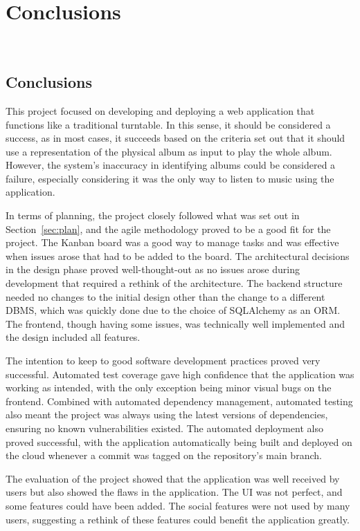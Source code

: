 \chapter{Conclusions}~\label{cha:conclusion}

\section{Conclusions}
This project focused on developing and deploying a web application that functions like a traditional turntable. In this sense, it should be considered a success, as in most cases, it succeeds based on the criteria set out that it should use a representation of the physical album as input to play the whole album. However, the system's inaccuracy in identifying albums could be considered a failure, especially considering it was the only way to listen to music using the application.

In terms of planning, the project closely followed what was set out in Section~\ref{sec:plan}, and the agile methodology proved to be a good fit for the project. The Kanban board was a good way to manage tasks and was effective when issues arose that had to be added to the board. The architectural decisions in the design phase proved well-thought-out as no issues arose during development that required a rethink of the architecture. The backend structure needed no changes to the initial design other than the change to a different DBMS, which was quickly done due to the choice of SQLAlchemy as an ORM. The frontend, though having some issues, was technically well implemented and the design included all features.

The intention to keep to good software development practices proved very successful. Automated test coverage gave high confidence that the application was working as intended, with the only exception being minor visual bugs on the frontend. Combined with automated dependency management, automated testing also meant the project was always using the latest versions of dependencies, ensuring no known vulnerabilities existed. The automated deployment also proved successful, with the application automatically being built and deployed on the cloud whenever a commit was tagged on the repository's main branch.

The evaluation of the project showed that the application was well received by users but also showed the flaws in the application. The UI was not perfect, and some features could have been added. The social features were not used by many users, suggesting a rethink of these features could benefit the application greatly.

